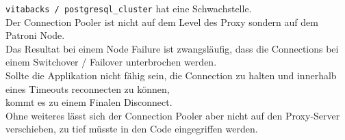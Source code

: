 \begin{flushleft}
    \texttt{vitabacks / postgresql\_cluster} hat eine Schwachstelle.\\
    Der \Gls{Connection Pooler} ist nicht auf dem Level des Proxy sondern auf dem Patroni Node.\\
    Das Resultat bei einem Node Failure ist zwangsläufig, dass die Connections bei einem \Gls{Switchover} / \Gls{Failover} unterbrochen werden.\\
    Sollte die Applikation nicht fähig sein, die Connection zu halten und innerhalb eines Timeouts reconnecten zu können,\\
    kommt es zu einem Finalen Disconnect.\\
    Ohne weiteres lässt sich der \Gls{Connection Pooler} aber nicht auf den Proxy-Server verschieben, zu tief müsste in den Code eingegriffen werden.
\end{flushleft}